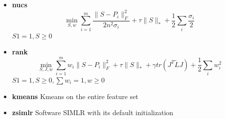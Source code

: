\documentclass[11pt]{article}
\begin{document}
\begin{itemize}
\item \textbf{nucs}
$$\min_{S,w} \sum_{i=1}^{m} \frac{\|S-P_i\|_F^2}{2n^2 \sigma_i} + \tau \|S\|_* + \frac{1}{2} \sum_i \frac{\sigma_i}{2}$$
$S1 = 1, S\geq 0$
\item \textbf{rank}
$$\min_{S,J,w} \sum_{i=1}^{m} w_i \|S-P_i\|_F^2 + \tau \|S\|_* + \gamma tr(J^T \tilde{L} J)+ \frac{1}{2} \sum_i w_i^2$$
$S1 = 1, S\geq 0, \sum w_i = 1, w \geq 0$
\item \textbf{kmeans}
Kmeans on the entire feature set

\item \textbf{zsimlr}
Software SIMLR with its default initialization
\end{itemize}


\pagebreak
\end{document}
